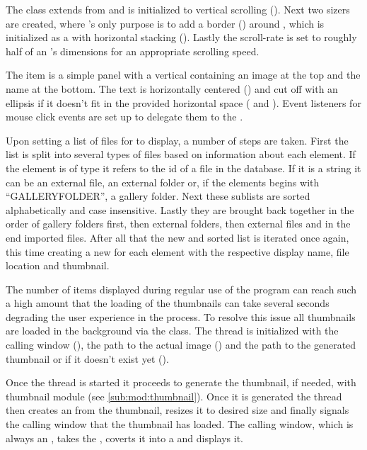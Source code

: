 \begin{sloppypar}
The  class extends from  and is
initialized to vertical scrolling (). Next
two sizers are created, where 's only purpose is to add a
border () around
, which is initialized as a  with horizontal
stacking (). Lastly the scroll-rate is set
to roughly half of an 's dimensions for an appropriate scrolling
speed.
\end{sloppypar}

\begin{sloppypar}
The item is a simple panel with a vertical  containing an
image at the top and the name at the bottom. The text is horizontally centered
() and cut off with an ellipsis if it
doesn't fit in the provided horizontal space ( and ). Event
listeners for mouse click events are set up to delegate them to the
.
\end{sloppypar}

Upon setting a list of files for  to display, a number of
steps are taken. First the list is split into several types of files based on
information about each element. If the element is of type  it
refers to the id of a file in the database. If it is a string it can be an
external file, an external folder or, if the elements begins with
``GALLERYFOLDER'', a gallery folder. Next these sublists are sorted
alphabetically and case insensitive. Lastly they are brought back together in
the order of gallery folders first, then external folders, then external files
and in the end imported files. After all that the new and sorted list is
iterated once again, this time creating a new  for each element
with the respective display name, file location and thumbnail.

The number of items displayed during regular use of the program can reach such
a high amount that the loading of the thumbnails can take several seconds
degrading the user experience in the process. To resolve this issue all
thumbnails are loaded in the background via the  class.
The thread is initialized with the calling window (), the
path to the actual image () and the path to the generated
thumbnail or  if it doesn't exist yet ().

Once the thread is started it proceeds to generate the thumbnail, if needed,
with thumbnail module (see \cref{sub:mod:thumbnail}). Once it is generated the
thread then creates an  from the thumbnail, resizes it to desired
size and finally signals the calling window that the thumbnail has loaded. The
calling window, which is always an , takes the ,
coverts it into a  and displays it.
